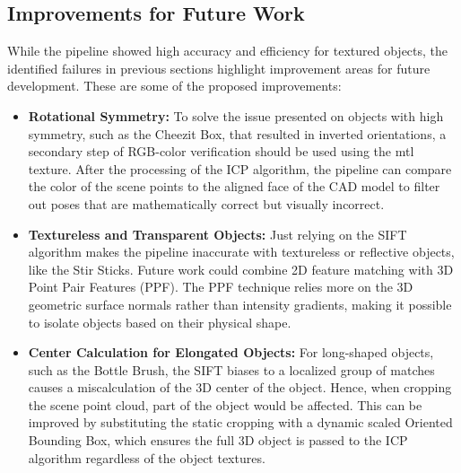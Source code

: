 \subsection{Improvements for Future Work}
While the pipeline showed high accuracy and efficiency for textured objects, the identified failures in previous sections highlight improvement areas for future development. These are some of the proposed improvements:

\begin{itemize}
    \item \textbf{Rotational Symmetry:} 
    To solve the issue presented on objects with high symmetry, such as the Cheezit Box, that resulted in inverted orientations, a secondary step of RGB-color verification should be used using the mtl texture. After the processing of the ICP algorithm, the pipeline can compare the color of the scene points to the aligned face of the CAD model to filter out poses that are mathematically correct but visually incorrect.

    \item \textbf{Textureless and Transparent Objects:} 
    Just relying on the SIFT algorithm makes the pipeline inaccurate with textureless or reflective objects, like the Stir Sticks. Future work could combine 2D feature matching with 3D Point Pair Features (PPF). The PPF technique relies more on the 3D geometric surface normals rather than intensity gradients, making it possible to isolate objects based on their physical shape. 

    \item \textbf{Center Calculation for Elongated Objects:} 
    For long-shaped objects, such as the Bottle Brush, the SIFT biases to a localized group of matches causes a miscalculation of the 3D center of the object. Hence, when cropping the scene point cloud, part of the object would be affected. This can be improved by substituting the static cropping with a dynamic scaled Oriented Bounding Box, which ensures the full 3D object is passed to the ICP algorithm regardless of the object textures.
\end{itemize}